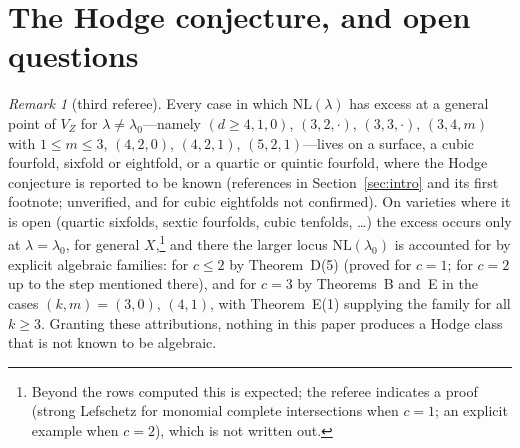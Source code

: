 \documentclass[10pt]{article}
\numberwithin{equation}{section}
\theoremstyle{remark}
\newtheorem{remark}[theorem]{Remark}
\newcommand{\NL}{\mathrm{NL}}
\newcommand{\VZ}{V_Z}
\begin{document}
\section{The Hodge conjecture, and open questions}\label{sec:open}
\begin{remark}[third referee]\label{rem:HC}
Every case in which $\NL(\lambda)$ has excess at a general point of $\VZ$ for $\lambda\ne\lambda_0$---namely
$(d\ge4,1,0)$, $(3,2,\cdot)$, $(3,3,\cdot)$, $(3,4,m)$ with $1\le m\le3$, $(4,2,0)$, $(4,2,1)$,
$(5,2,1)$---lives on a surface, a cubic fourfold, sixfold or eightfold, or a quartic or quintic fourfold, where
the Hodge conjecture is reported to be known (references in Section~\ref{sec:intro} and its first footnote;
unverified, and for cubic eightfolds not confirmed). On varieties
where it is open (quartic sixfolds, sextic fourfolds, cubic tenfolds, \dots) the excess occurs only at
$\lambda=\lambda_0$, for general $X$,\footnote{Beyond the rows computed this is expected; the referee indicates a
proof (strong Lefschetz for monomial complete intersections when $c=1$; an explicit example when $c=2$), which is
not written out.} and there the larger locus $\NL(\lambda_0)$ is accounted for by explicit algebraic families:
for $c\le2$ by Theorem~D(5) (proved for $c=1$; for $c=2$ up to the step mentioned there), and for $c=3$ by
Theorems~B and~E in the cases $(k,m)=(3,0)$, $(4,1)$, with Theorem~E(1) supplying the family for all $k\ge3$.
Granting these attributions, nothing in this paper produces a Hodge class that is not known to be algebraic.
\end{remark}
\end{document}
